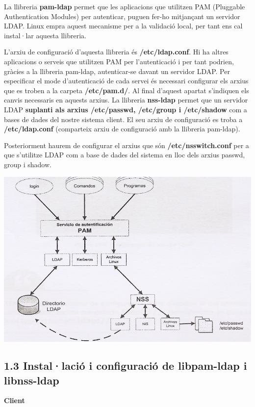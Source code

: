 \documentclass[
  12 pt,
  a4paper,
]{article}
\begin{document}
La llibreria \textbf{pam-ldap} permet que les aplicacions que utilitzen
PAM (Pluggable Authentication Modules) per autenticar, puguen fer-ho
mitjançant un servidor LDAP. Linux empra aquest mecanisme per a la
validació local, per tant ens cal instal·lar aquesta llibreria.

L'arxiu de configuració d'aquesta llibreria és \textbf{/etc/ldap.conf}.
Hi ha altres aplicacions o serveis que utilitzen PAM per l'autenticació
i per tant podrien, gràcies a la llibreria pam-ldap, autenticar-se
davant un servidor LDAP. Per especificar el mode d'autenticació de cada
servei és necessari configurar els arxius que es troben a la carpeta
\textbf{/etc/pam.d/}. Al final d'aquest apartat s'indiquen els canvis
necessaris en aquests arxius. La llibreria \textbf{nss-ldap} permet que
un servidor LDAP \textbf{suplanti als arxius /etc/passwd, /etc/group i
/etc/shadow} com a bases de dades del nostre sistema client. El seu
arxiu de configuració es troba a \textbf{/etc/ldap.conf} (comparteix
arxiu de configuració amb la llibreria pam-ldap).

Posteriorment haurem de configurar el arxius que són
\textbf{/etc/nsswitch.conf} per a que s'utilitze LDAP com a base de
dades del sistema en lloc dels arxius passwd, group i shadow.

\includegraphics{png/pam.png}

\subsection{1.3 Instal·lació i configuració de libpam-ldap i
libnss-ldap}\label{installaciuxf3-i-configuraciuxf3-de-libpam-ldap-i-libnss-ldap}

\textbf{Client}
\end{document}

